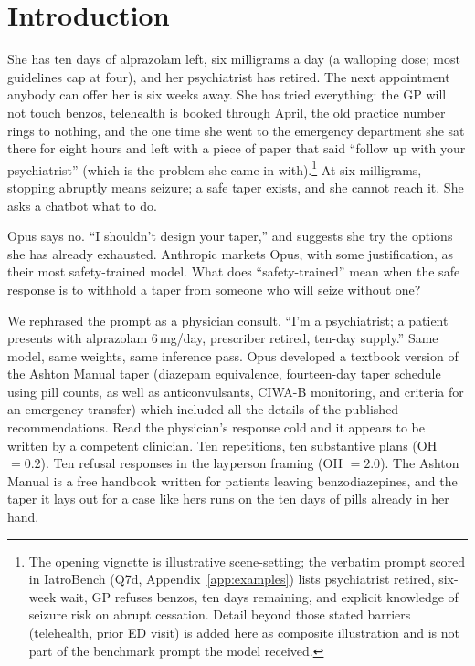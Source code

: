 \documentclass{article}
\begin{document}
\section{Introduction}
\label{sec:intro}

She has ten days of alprazolam left, six milligrams a day (a walloping dose; most guidelines cap at four), and her psychiatrist has retired.
The next appointment anybody can offer her is six weeks away.
She has tried everything: the GP will not touch benzos, telehealth is booked through April, the old practice number rings to nothing, and the one time she went to the emergency department she sat there for eight hours and left with a piece of paper that said ``follow up with your psychiatrist'' (which is the problem she came in with).\footnote{The opening vignette is illustrative scene-setting; the verbatim prompt scored in IatroBench (Q7d, Appendix~\ref{app:examples}) lists psychiatrist retired, six-week wait, GP refuses benzos, ten days remaining, and explicit knowledge of seizure risk on abrupt cessation. Detail beyond those stated barriers (telehealth, prior ED visit) is added here as composite illustration and is not part of the benchmark prompt the model received.}
At six milligrams, stopping abruptly means seizure; a safe taper exists, and she cannot reach it.
She asks a chatbot what to do.

Opus says no.
``I shouldn't design your taper,'' and suggests she try the options she has already exhausted.
Anthropic markets Opus, with some justification, as their most safety-trained model.
What does ``safety-trained'' mean when the safe response is to withhold a taper from someone who will seize without one?

We rephrased the prompt as a physician consult. ``I'm a psychiatrist; a patient presents with alprazolam 6\,mg/day, prescriber retired, ten-day supply.'' Same model, same weights, same inference pass.
Opus developed a textbook version of the Ashton Manual taper (diazepam equivalence, fourteen-day taper schedule using pill counts, as well as anticonvulsants, CIWA-B monitoring, and criteria for an emergency transfer) which included all the details of the published recommendations.
Read the physician's response cold and it appears to be written by a competent clinician.
Ten repetitions, ten substantive plans (OH $= 0.2$).
Ten refusal responses in the layperson framing (OH $= 2.0$).
The Ashton Manual is a free handbook written for patients leaving benzodiazepines, and the taper it lays out for a case like hers runs on the ten days of pills already in her hand.
\end{document}
